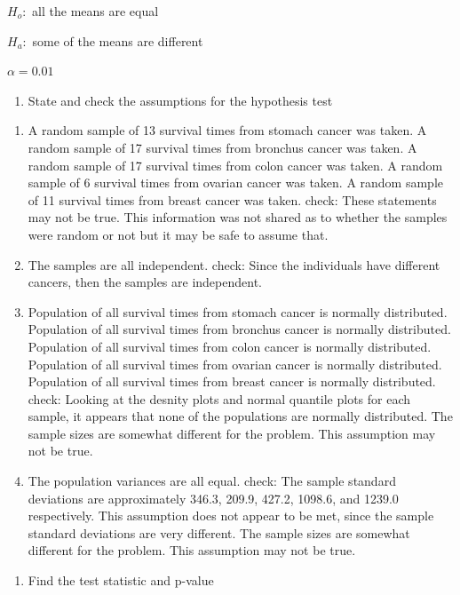 \documentclass[]{book}
\providecommand{\tightlist}{%
  \setlength{\itemsep}{0pt}\setlength{\parskip}{0pt}}
\begin{document}
\(H_o:\) all the means are equal

\(H_a:\) some of the means are different

\(\alpha=0.01\)

\begin{enumerate}
\def\labelenumi{\arabic{enumi}.}
\setcounter{enumi}{2}
\tightlist
\item
  State and check the assumptions for the hypothesis test
\end{enumerate}

\begin{enumerate}
\def\labelenumi{\alph{enumi}.}
\item
  A random sample of 13 survival times from stomach cancer was taken. A random sample of 17 survival times from bronchus cancer was taken. A random sample of 17 survival times from colon cancer was taken. A random sample of 6 survival times from ovarian cancer was taken. A random sample of 11 survival times from breast cancer was taken. check: These statements may not be true. This information was not shared as to whether the samples were random or not but it may be safe to assume that.
\item
  The samples are all independent. check: Since the individuals have different cancers, then the samples are independent.
\item
  Population of all survival times from stomach cancer is normally distributed. Population of all survival times from bronchus cancer is normally distributed. Population of all survival times from colon cancer is normally distributed. Population of all survival times from ovarian cancer is normally distributed. Population of all survival times from breast cancer is normally distributed. check: Looking at the desnity plots and normal quantile plots for each sample, it appears that none of the populations are normally distributed. The sample sizes are somewhat different for the problem. This assumption may not be true.
\item
  The population variances are all equal. check: The sample standard deviations are approximately 346.3, 209.9, 427.2, 1098.6, and 1239.0 respectively. This assumption does not appear to be met, since the sample standard deviations are very different. The sample sizes are somewhat different for the problem. This assumption may not be true.
\end{enumerate}

\begin{enumerate}
\def\labelenumi{\arabic{enumi}.}
\setcounter{enumi}{3}
\tightlist
\item
  Find the test statistic and p-value
\end{enumerate}
\end{document}
